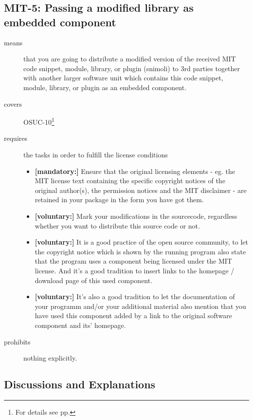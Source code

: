 \subsection{MIT-5: Passing a modified library as embedded component}
\label{OSUC-10-MIT}
\begin{description}
\item[means] that you are going to distribute a modified version of the received
MIT code snippet, module, library, or plugin (snimoli) to 3rd parties together
with another larger software unit which contains this code snippet, module,
library, or plugin as an embedded component.
\item[covers] OSUC-10\footnote{For details see pp. \pageref{OSUC-10-DEF}}
\item[requires] the tasks in order to fulfill the license conditions
\begin{itemize}
  \item \textbf{[mandatory:]} Ensure that the original licensing elements - eg.
  the MIT license text containing the specific copyright notices of the original
  author(s), the permission notices and the MIT disclaimer - are retained in
  your package in the form you have got them.
  \item \textbf{[voluntary:]} Mark your modifications in the sourcecode,
  regardless whether you want to distribute this source code or not.
  
  \item \textbf{[voluntary:]} It is a good practice of the open source
  community, to let the copyright notice which is shown by the running program
  also state that the program uses a component being licensed under the MIT
  license. And it's a good tradition to insert links to the homepage / download
  page of this used component.

  \item \textbf{[voluntary:]} It's also a good tradition to let the
  documentation of your programm and/or your additional material also mention
  that you have used this component added by a link to the original software
  component and its' homepage.
\end{itemize}
\item[prohibits] nothing explicitly.
\end{description}

\subsection{Discussions and Explanations}

